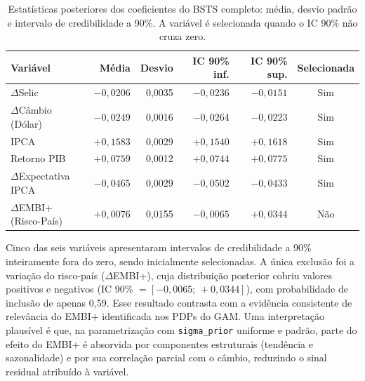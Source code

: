 \documentclass[	12pt, Times, openright, oneside, a4paper, english, brazil]{abntex2}
\begin{document}
\begin{table}[ht!]
\centering
\begin{tabular}{|l|r|r|r|r|c|}
\hline
\textbf{Variável} & \textbf{Média} & \textbf{Desvio} & \textbf{IC 90\% inf.} & \textbf{IC 90\% sup.} & \textbf{Selecionada} \\ \hline
$\Delta$Selic              & $-0{,}0206$ & 0{,}0035 & $-0{,}0236$ & $-0{,}0151$ & Sim \\ \hline
$\Delta$Câmbio (Dólar)     & $-0{,}0249$ & 0{,}0016 & $-0{,}0264$ & $-0{,}0223$ & Sim \\ \hline
IPCA                       & $+0{,}1583$ & 0{,}0029 & $+0{,}1540$ & $+0{,}1618$ & Sim \\ \hline
Retorno PIB                & $+0{,}0759$ & 0{,}0012 & $+0{,}0744$ & $+0{,}0775$ & Sim \\ \hline
$\Delta$Expectativa IPCA   & $-0{,}0465$ & 0{,}0029 & $-0{,}0502$ & $-0{,}0433$ & Sim \\ \hline
$\Delta$EMBI+ (Risco-País) & $+0{,}0076$ & 0{,}0155 & $-0{,}0065$ & $+0{,}0344$ & Não \\ \hline
\end{tabular}
\caption{Estatísticas posteriores dos coeficientes do BSTS completo: média, desvio padrão e intervalo de credibilidade a 90\%. A variável é selecionada quando o IC 90\% não cruza zero.}\label{tab:bsts_selecao}
\end{table}

\begin{sloppypar}
Cinco das seis variáveis apresentaram intervalos de credibilidade a 90\% inteiramente fora do zero, sendo inicialmente selecionadas. A única exclusão foi a variação do risco-país ($\Delta$EMBI+), cuja distribuição posterior cobriu valores positivos e negativos (IC 90\% $= [-0{,}0065;\, +0{,}0344]$), com probabilidade de inclusão de apenas 0{,}59. Esse resultado contrasta com a evidência consistente de relevância do EMBI+ identificada nos PDPs do GAM. Uma interpretação plausível é que, na parametrização com \texttt{sigma\_prior} uniforme e padrão, parte do efeito do EMBI+ é absorvida por componentes estruturais (tendência e sazonalidade) e por sua correlação parcial com o câmbio, reduzindo o sinal residual atribuído à variável.
\end{sloppypar}
\end{document}
